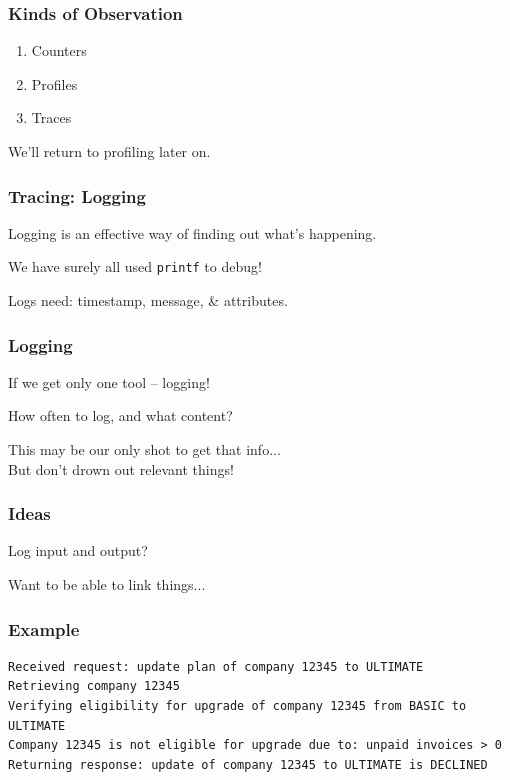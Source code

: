 \begin{frame}
\frametitle{Kinds of Observation}

\begin{enumerate}
	\item Counters
	\item Profiles
	\item Traces
\end{enumerate}

We'll return to profiling later on.

\end{frame}


\begin{frame}
\frametitle{Tracing: Logging}

Logging is an effective way of finding out what's happening.

We have surely all used \texttt{printf} to debug!

Logs need: timestamp, message, \& attributes.

\end{frame}


\begin{frame}
\frametitle{Logging} 

If we get only one tool -- logging!

How often to log, and what content?

This may be our only shot to get that info...\\
\quad But don't drown out relevant things!


\end{frame}


\begin{frame}
\frametitle{Ideas}

Log input and output?

Want to be able to link things...


\end{frame}


\begin{frame}[fragile]
\frametitle{Example}

{\scriptsize
\begin{verbatim}
Received request: update plan of company 12345 to ULTIMATE
Retrieving company 12345
Verifying eligibility for upgrade of company 12345 from BASIC to ULTIMATE
Company 12345 is not eligible for upgrade due to: unpaid invoices > 0
Returning response: update of company 12345 to ULTIMATE is DECLINED
\end{verbatim}
}

\end{frame}


